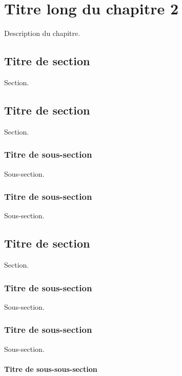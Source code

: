 \chapter[Titre court du chapitre 2] 
        {\singlespacing%
         Titre long du chapitre 2}
         \label{ch:chapitre-2}

    Description du chapitre.

\section{Titre de section}

    Section.

\section{Titre de section}
        
    Section.
        
    \subsection{Titre de sous-section}
    
    Sous-section.
    
    \subsection{Titre de sous-section}

    Sous-section.
        
\section{Titre de section}

    Section.
        
    \subsection{Titre de sous-section}
    
    Sous-section.
    
    \subsection{Titre de sous-section}
    
    Sous-section.
    
    \subsubsection{Titre de sous-sous-section}
    
